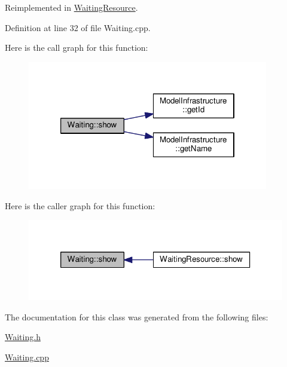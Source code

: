 Reimplemented in \hyperlink{class_waiting_resource_afb0323a90d99b50d66de7f38d069b122}{Waiting\-Resource}.



Definition at line 32 of file Waiting.\-cpp.



Here is the call graph for this function\-:\nopagebreak
\begin{figure}[H]
\begin{center}
\leavevmode
\includegraphics[width=298pt]{class_waiting_aa8b8a3e589f580e3e066a0f9423f4c76_cgraph}
\end{center}
\end{figure}




Here is the caller graph for this function\-:
\nopagebreak
\begin{figure}[H]
\begin{center}
\leavevmode
\includegraphics[width=318pt]{class_waiting_aa8b8a3e589f580e3e066a0f9423f4c76_icgraph}
\end{center}
\end{figure}




The documentation for this class was generated from the following files\-:\begin{DoxyCompactItemize}
\item 
\hyperlink{_waiting_8h}{Waiting.\-h}\item 
\hyperlink{_waiting_8cpp}{Waiting.\-cpp}\end{DoxyCompactItemize}
